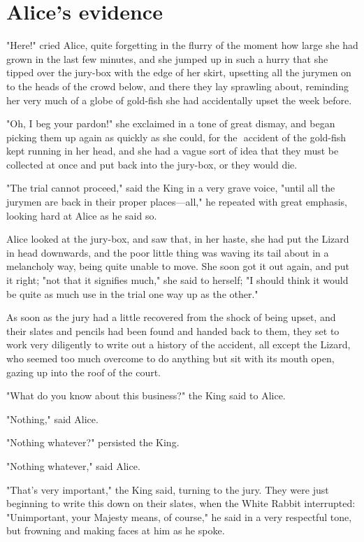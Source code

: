 \quebra\chapter*{Alice's evidence}

"Here!" cried Alice, quite forgetting in the flurry of the moment how large she had grown in the last few minutes, and she jumped up in such a hurry that she tipped over the jury-box with the edge of her skirt, upsetting all the jurymen on to the heads of the crowd below, and there they lay sprawling about, reminding her very much of a globe of gold-fish she had accidentally upset the week before.

"Oh, I beg your pardon!" she exclaimed in a tone of great dismay, and began picking them up again as quickly as she could, for the ​
accident of the gold-fish kept running in her head, and she had a vague sort of idea that they must be collected at once and put back into the jury-box, or they would die.

​"The trial cannot proceed," said the King in a very grave voice, "until all the jurymen are back in their proper places—all," he repeated with great emphasis, looking hard at Alice as he said so.

Alice looked at the jury-box, and saw that, in her haste, she had put the Lizard in head downwards, and the poor little thing was waving its tail about in a melancholy way, being quite unable to move. She soon got it out again, and put it right; "not that it signifies much," she said to herself; "I should think it would be quite as much use in the trial one way up as the other."

As soon as the jury had a little recovered from the shock of being upset, and their slates and pencils had been found and handed back to them, they set to work very diligently to write out a history of the accident, all except the Lizard, who seemed too much overcome to do anything but sit with its mouth open, gazing up into the roof of the court.

​"What do you know about this business?" the King said to Alice.

"Nothing," said Alice.

"Nothing whatever?" persisted the King.

"Nothing whatever," said Alice.

"That's very important," the King said, turning to the jury. They were just beginning to write this down on their slates, when the White Rabbit interrupted: "Unimportant, your Majesty means, of course," he said in a very respectful tone, but frowning and making faces at him as he spoke.

